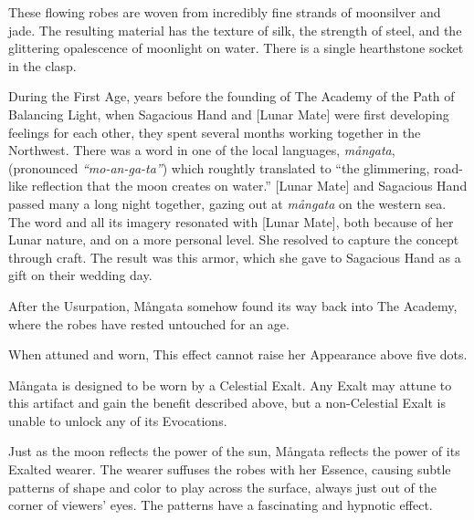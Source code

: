 ﻿



These flowing robes are woven from incredibly fine strands of moonsilver and
jade. The resulting material has the texture of silk, the strength of steel,
and the glittering opalescence of moonlight on water. There is a single
hearthstone socket in the clasp.

During the First Age, years before the founding of The Academy of the Path of
Balancing Light, when Sagacious Hand and [Lunar Mate] were first developing
feelings for each other, they spent several months working together in the
Northwest. There was a word in one of the local languages, \textit{mångata},
(pronounced \textit{``mo-an-ga-ta''}) which roughtly translated to ``the
glimmering, road-like reflection that the moon creates on water.'' [Lunar Mate]
and Sagacious Hand passed many a long night together, gazing out at
\textit{mångata} on the western sea. The word and all its imagery resonated
with [Lunar Mate], both because of her Lunar nature, and on a more personal
level. She resolved to capture the concept through craft. The result was this
armor, which she gave to Sagacious Hand as a gift on their wedding day.

After the Usurpation, Mångata somehow found its way back into The Academy,
where the robes have rested untouched for an age.



When attuned and worn,  This effect cannot raise her Appearance above
five dots.

Mångata is designed to be worn by a Celestial Exalt. Any Exalt may attune to
this artifact and gain the benefit described above, but a non-Celestial Exalt
is unable to unlock any of its Evocations.



Just as the moon reflects the power of the sun, Mångata reflects the power of
its Exalted wearer. The wearer suffuses the robes with her Essence, causing
subtle patterns of shape and color to play across the surface, always just out
of the corner of viewers' eyes. The patterns have a fascinating and hypnotic
effect. 

